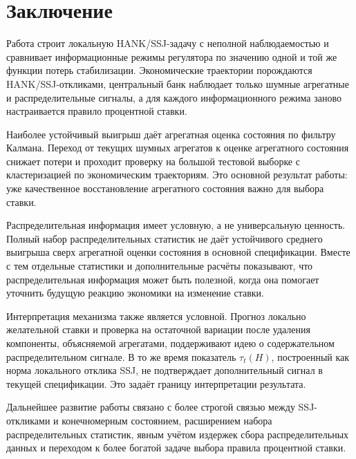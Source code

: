 \section{Заключение}

Работа строит локальную HANK/SSJ-задачу с неполной наблюдаемостью и сравнивает информационные
режимы регулятора по значению одной и той же функции потерь стабилизации. Экономические
траектории порождаются HANK/SSJ-откликами, центральный банк наблюдает только шумные агрегатные и
распределительные сигналы, а для каждого информационного режима заново настраивается правило
процентной ставки.

Наиболее устойчивый выигрыш даёт агрегатная оценка состояния по фильтру Калмана. Переход от
текущих шумных агрегатов к оценке агрегатного состояния снижает потери и проходит проверку на
большой тестовой выборке с кластеризацией по экономическим траекториям. Это основной результат
работы: уже качественное восстановление агрегатного состояния важно для выбора ставки.

Распределительная информация имеет условную, а не универсальную ценность. Полный набор
распределительных статистик не даёт устойчивого среднего выигрыша сверх агрегатной оценки
состояния в основной спецификации. Вместе с тем отдельные статистики и дополнительные расчёты
показывают, что распределительная информация может быть полезной, когда она помогает уточнить
будущую реакцию экономики на изменение ставки.

Интерпретация механизма также является условной. Прогноз локально желательной ставки и проверка
на остаточной вариации после удаления компоненты, объясняемой агрегатами, поддерживают идею о
содержательном распределительном сигнале. В то же время показатель \(\tau_t(H)\), построенный как
норма локального отклика SSJ, не подтверждает дополнительный сигнал в текущей спецификации. Это
задаёт границу интерпретации результата.

Дальнейшее развитие работы связано с более строгой связью между SSJ-откликами и конечномерным
состоянием, расширением набора распределительных статистик, явным учётом издержек сбора
распределительных данных и переходом к более богатой задаче выбора правила процентной ставки.

